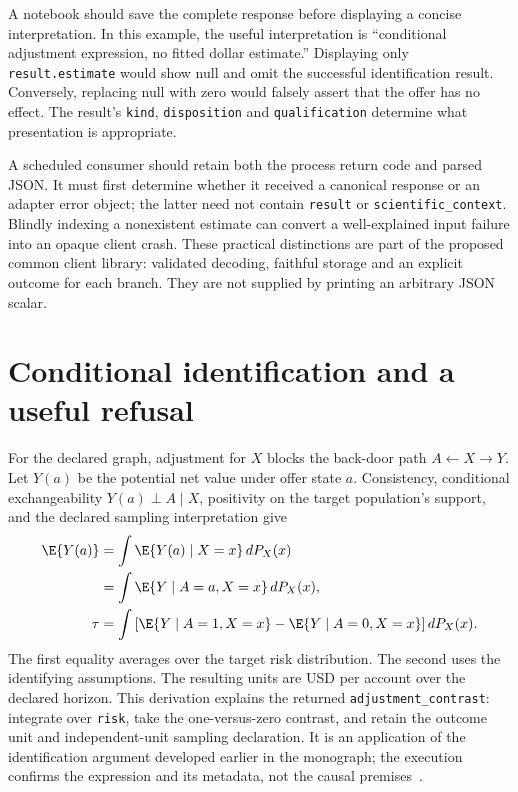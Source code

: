 A notebook should save the complete response before displaying a concise
interpretation. In this example, the useful interpretation is ``conditional
adjustment expression, no fitted dollar estimate.'' Displaying only
\texttt{result.estimate} would show null and omit the successful identification
result. Conversely, replacing null with zero would falsely assert that the
offer has no effect. The result's \texttt{kind}, \texttt{disposition} and
\texttt{qualification} determine what presentation is appropriate.

A scheduled consumer should retain both the process return code and parsed
JSON. It must first determine whether it received a canonical response or an
adapter error object; the latter need not contain \texttt{result} or
\texttt{scientific\_context}. Blindly indexing a nonexistent estimate can
convert a well-explained input failure into an opaque client crash. These
practical distinctions are part of the proposed common client library:
validated decoding, faithful storage and an explicit outcome for each branch.
They are not supplied by printing an arbitrary JSON scalar.

\section{Conditional identification and a useful refusal}

For the declared graph, adjustment for $X$ blocks the back-door path
$A\leftarrow X\to Y$. Let $Y(a)$ be the potential net value under offer
state $a$. Consistency, conditional exchangeability
$Y(a)\perp A\mid X$, positivity on the target population's support, and the
declared sampling interpretation give
\begin{align*}
 \E\{Y(a)\}&=\int \E\{Y(a)\mid X=x\}\,dP_X(x)\\
 &=\int \E\{Y\mid A=a,X=x\}\,dP_X(x),\\
 \tau&=\int\left[\E\{Y\mid A=1,X=x\}
                 -\E\{Y\mid A=0,X=x\}\right]dP_X(x).
\end{align*}
The first equality averages over the target risk distribution. The second
uses the identifying assumptions. The resulting units are USD per account
over the declared horizon. This derivation explains the returned
\texttt{adjustment\_contrast}: integrate over \texttt{risk}, take the
one-versus-zero contrast, and retain the outcome unit and independent-unit
sampling declaration. It is an application of the identification argument
developed earlier in the monograph; the execution confirms the expression
and its metadata, not the causal premises~\citep{exec13_i2_examples}.

